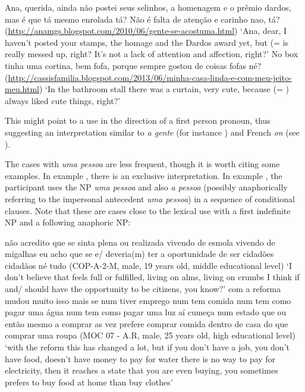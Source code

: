 \documentclass[output=paper]{langscibook}
\begin{document}
\eanoraggedright\label{ex:amaral:34}
Ana, querida, ainda não postei seus selinhos, a homenagem e o prêmio dardos, mas é que {} tá mesmo enrolada tá? Não é falta de atenção e carinho nao, tá? (\url{http://anamgs.blogspot.com/2010/06/gente-se-acostuma.html})
\glt ‘Ana, dear, I haven’t posted your stamps, the homage and the Dardos award yet, but {} {(=} {} {is really messed up, right? It’s not a lack of attention and affection, right?’}
\ex\label{ex:amaral:35}No box tinha uma cortina, bem fofa, porque  sempre gostou de coisas fofas né? (\url{http://cassisfamilia.blogspot.com/2013/06/minha-casa-linda-e-com-meu-jeito-meu.html}) 
\glt ‘In the bathroom stall there was a curtain, very cute, because  (= ) always liked cute things, right?’
\z 


This might point to a use in the direction of a first person pronoun, thus suggesting an interpretation similar to \textit{a gente} (for instance \citealt{Lopes2004}) and French \textit{on} (see \citealt{Coveney2000}).


The cases with \textit{uma pessoa} are less frequent, though it is worth citing some examples. In example , there is an exclusive interpretation. In example , the participant uses the NP \textit{uma pessoa} and also \textit{a pessoa} (possibly anaphorically referring to the impersonal antecedent \textit{uma pessoa})  in a sequence of conditional clauses. Note that these are cases close to the lexical use with a first indefinite NP and a following anaphoric NP: 

\eanoraggedright\label{ex:amaral:36}
não acredito que  se sinta plena ou realizada vivendo de esmola vivendo de migalhas eu acho que se e/  deveria(m) ter a oportunidade de ser cidadões cidadãos né tudo (COP-A-2-M, male, 19 years old, middle educational level)
\glt ‘I don't believe that  {feels full or fulfilled, living on alms, living on crumbs I think if and/}{} should have the opportunity to be citizens, you know?’
\ex\label{ex:amaral:37}com a reforma mudou muito isso mais se num tiver emprego num tem comida num tem como  pagar uma água num tem como   pagar uma luz aí cumeça num estado que  ou então mesmo a comprar  as vez prefere comprar comida dentro de casa do que comprar uma roupa {(MOC 07 - A.R, male, 25 years old, high educational level)}
\glt ‘with the reform this has changed a lot, but if you don’t have a job, you don’t have food,  doesn’t have money to pay for water there is no way to pay for electricity, then it reaches a state that you are even buying, you sometimes prefers to buy food at home than buy clothes’
\z 
\end{document}
